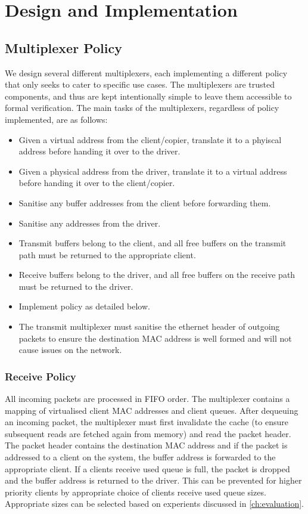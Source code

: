 \chapter{Design and Implementation}\label{ch:design}

\section{Multiplexer Policy}

We design several different multiplexers, each implementing a different policy
that only seeks to cater to specific use cases. The multiplexers are trusted components,
and thus are kept intentionally simple to leave them accessible to formal verification.
The main tasks of the multiplexers, regardless of policy implemented, are as follows:

\begin{itemize}
    \item Given a virtual address from the client/copier, translate it to a phyiscal address before
            handing it over to the driver.
    \item Given a physical address from the driver, translate it to a virtual address before
            handing it over to the client/copier.
    \item Sanitise any buffer addresses from the client before forwarding them.
    \item Sanitise any addresses from the driver. 
    \item Transmit buffers belong to the client, and all free buffers on the transmit path
            must be returned to the appropriate client.
    \item Receive buffers belong to the driver, and all free buffers on the receive path
            must be returned to the driver.
    \item Implement policy as detailed below.
    \item The transmit multiplexer must sanitise the ethernet header of outgoing packets
          to ensure the destination MAC address is well formed and will not cause issues
          on the network. 
\end{itemize}


\subsection{Receive Policy}

All incoming packets are processed in FIFO order. The multiplexer contains a 
mapping of virtualised client MAC addresses and client queues. After dequeuing an incoming packet,
the multiplexer must first invalidate the cache (to ensure subsequent reads are fetched again from memory)
and read the packet header. The packet header contains the destination MAC address and if the packet is
addressed to a client on the system, the buffer address is forwarded to the appropriate client. 
If a clients receive used queue is full, the packet is dropped and the buffer address is returned to
the driver. This can be prevented for higher priority clients by appropriate choice of clients receive
used queue sizes. Appropriate sizes can be selected based on experients discussed in \autoref{ch:evaluation}.

